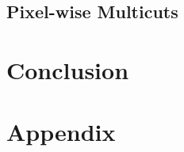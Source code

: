 \documentclass[10pt,twocolumn,letterpaper]{article}
\begin{document}
\subsection{Pixel-wise Multicuts}



\section{Conclusion}

    



{\small


}

\newpage
\onecolumn
\section{Appendix}








\end{document}
